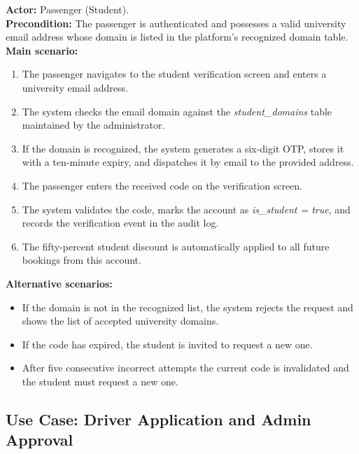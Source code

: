 \textbf{Actor:} Passenger (Student).\\
\textbf{Precondition:} The passenger is authenticated and possesses a valid university email address whose domain is listed in the platform's recognized domain table.\\
\textbf{Main scenario:}
\begin{enumerate}[noitemsep]
    \item The passenger navigates to the student verification screen and enters a university email address.
    \item The system checks the email domain against the \textit{student\_domains} table maintained by the administrator.
    \item If the domain is recognized, the system generates a six-digit OTP, stores it with a ten-minute expiry, and dispatches it by email to the provided address.
    \item The passenger enters the received code on the verification screen.
    \item The system validates the code, marks the account as \textit{is\_student = true}, and records the verification event in the audit log.
    \item The fifty-percent student discount is automatically applied to all future bookings from this account.
\end{enumerate}
\textbf{Alternative scenarios:}
\begin{itemize}[noitemsep]
    \item If the domain is not in the recognized list, the system rejects the request and shows the list of accepted university domains.
    \item If the code has expired, the student is invited to request a new one.
    \item After five consecutive incorrect attempts the current code is invalidated and the student must request a new one.
\end{itemize}

\subsection{Use Case: Driver Application and Admin Approval}

